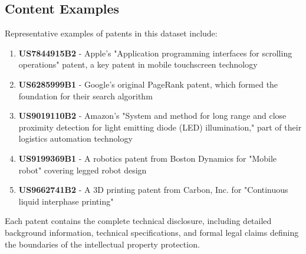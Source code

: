 \subsection{Content Examples}

Representative examples of patents in this dataset include:

\begin{enumerate}
    \item \textbf{US7844915B2} - Apple's "Application programming interfaces for scrolling operations" patent, a key patent in mobile touchscreen technology
    
    \item \textbf{US6285999B1} - Google's original PageRank patent, which formed the foundation for their search algorithm
    
    \item \textbf{US9019110B2} - Amazon's "System and method for long range and close proximity detection for light emitting diode (LED) illumination," part of their logistics automation technology
    
    \item \textbf{US9199369B1} - A robotics patent from Boston Dynamics for "Mobile robot" covering legged robot design
    
    \item \textbf{US9662741B2} - A 3D printing patent from Carbon, Inc. for "Continuous liquid interphase printing"
\end{enumerate}

Each patent contains the complete technical disclosure, including detailed background information, technical specifications, and formal legal claims defining the boundaries of the intellectual property protection.